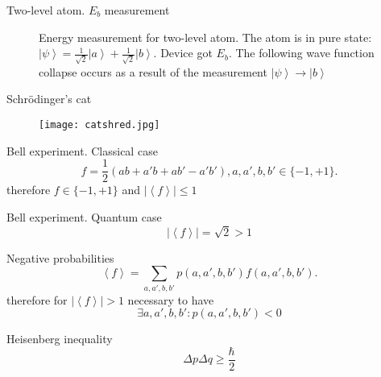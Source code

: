 \documentclass[10pt,pdf,hyperref={unicode}]{beamer}
\begin{document}
\begin{frame}{Two-level atom. $E_b$ measurement}
\begin{figure}
\centering



\caption{Energy measurement for two-level atom. The atom is in pure
  state: $\left|\psi\right> = 
\frac{1}{\sqrt{2}}\left|a\right> + \frac{1}{\sqrt{2}}\left|b\right>$.
Device got $E_b$. The following wave function collapse occurs as a
  result of the measurement $\left|\psi\right> \to \left|b\right>$
}
\label{fig:add:mesure_ex_b}
\end{figure}
\end{frame}

\begin{frame}{Schrödinger's cat}
 \begin{figure} 
   \texttt{[image: catshred.jpg]}
  \end{figure}
\end{frame}

\begin{frame}{Bell experiment. Classical case}
\[
f = \frac{1}{2}\left(
a b + a' b + a b' - a' b'
\right), a,a',b,b' \in \{-1, +1\}.
\]
therefore
\(
f \in \{-1, +1\}
\)
and
\(
\left|\left<f\right>\right| \le 1
\)
\end{frame}

\begin{frame}{Bell experiment. Quantum case}
\[
\left|\left<f\right>\right| = \sqrt{2} > 1
\]
\end{frame}


\begin{frame}{Negative probabilities}
\[
\left<f\right> = \sum_{a,a',b,b'} p(a,a',b,b') f(a,a',b,b').
\]
therefore for $\left|\left<f\right>\right| > 1$ necessary to have
\[
\exists a,a',b,b': p(a,a',b,b') < 0
\]
\end{frame}

\begin{frame}{Heisenberg inequality}
  \[
  \Delta p \Delta q \ge \frac{\hbar}{2}
  \]
\end{frame}
\end{document}
